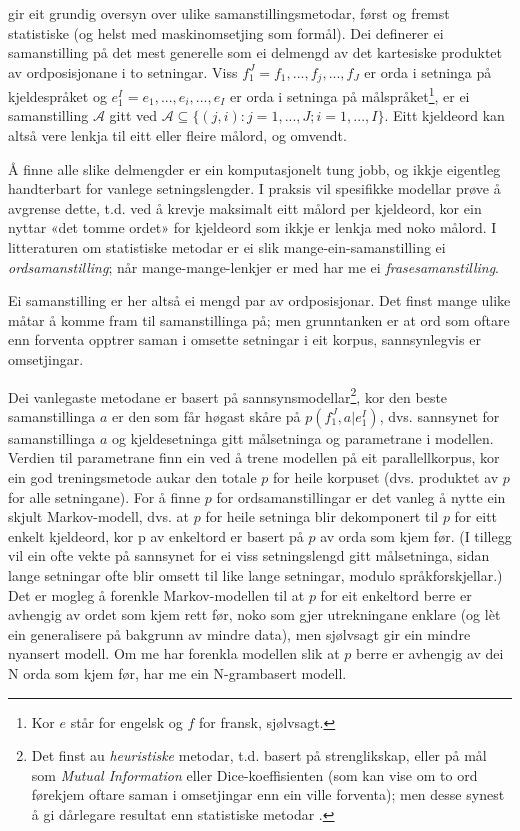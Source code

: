 \documentclass[11pt,a4paper,oneside,draft]{report}
\begin{document}
 \citet[s.~20--21]{och2003scv} gir eit grundig oversyn over ulike
 samanstillingsmetodar, først og fremst statistiske (og helst med
 maskinomsetjing som formål). Dei definerer ei samanstilling på det
 mest generelle som ei delmengd av det kartesiske produktet av
 ordposisjonane i to setningar. Viss $f_{1}^{J}=f_1,...,f_j,...,f_J$
 er orda i setninga på kjeldespråket og
 $e_{1}^{I}=e_1,...,e_i,...,e_I$ er orda i setninga på
 målspråket\footnote{Kor $e$ står for engelsk og $f$ for fransk, sjølvsagt. }, er ei samanstilling $\mathcal{A}$ gitt ved
 $\mathcal{A}\subseteq \{(j,i): j=1,...,J;i=1,...,I\}$. Eitt kjeldeord
 kan altså vere lenkja til eitt eller fleire målord, og omvendt.

 Å finne alle slike delmengder er ein komputasjonelt tung jobb, og
 ikkje eigentleg handterbart for vanlege setningslengder.  I praksis
 vil spesifikke modellar prøve å avgrense dette, t.d. ved å krevje
 maksimalt eitt målord per kjeldeord, kor ein nyttar «det tomme ordet»
 for kjeldeord som ikkje er lenkja med noko målord. I litteraturen om
 statistiske metodar er ei slik mange-ein-samanstilling ei
 \emph{ordsamanstilling}; når mange-mange-lenkjer er med har me ei
 \emph{frasesamanstilling}.

 Ei samanstilling er her altså ei mengd par av ordposisjonar. Det
 finst mange ulike måtar å komme fram til samanstillinga på; men
 grunntanken er at ord som oftare enn forventa opptrer saman i omsette
 setningar i eit korpus, sannsynlegvis er omsetjingar.

 Dei vanlegaste metodane er basert på sannsynsmodellar\footnote{Det finst au \emph{heuristiske} metodar, t.d. basert på
        strenglikskap, eller på mål som \emph{Mutual Information} eller
        Dice-koeffisienten (som kan vise om to ord førekjem oftare
        saman i omsetjingar enn ein ville forventa); men desse synest
        å gi dårlegare resultat enn statistiske metodar
        \citep{och2003scv}. }, kor den
 beste samanstillinga $a$ er den som får høgast skåre på
 $p(f_1^J,a|e_1^I)$, dvs. sannsynet for samanstillinga $a$ og
 kjeldesetninga gitt målsetninga og parametrane i modellen. Verdien
 til parametrane finn ein ved å trene modellen på eit parallellkorpus,
 kor ein god treningsmetode aukar den totale $p$ for heile korpuset
 (dvs. produktet av $p$ for alle setningane).  For å finne $p$ for
 ordsamanstillingar er det vanleg å nytte ein skjult Markov-modell,
 dvs. at $p$ for heile setninga blir dekomponert til $p$ for eitt
 enkelt kjeldeord, kor p av enkeltord er basert på $p$ av orda som
 kjem før. (I tillegg vil ein ofte vekte på sannsynet for ei viss
 setningslengd gitt målsetninga, sidan lange setningar ofte blir
 omsett til like lange setningar, modulo språkforskjellar.) Det er
 mogleg å forenkle Markov-modellen til at $p$ for eit enkeltord berre
 er avhengig av ordet som kjem rett før, noko som gjer utrekningane
 enklare (og lèt ein generalisere på bakgrunn av mindre data), men
 sjølvsagt gir ein mindre nyansert modell. Om me har forenkla modellen
 slik at $p$ berre er avhengig av dei N orda som kjem før, har me ein
 N-grambasert modell.
 
\end{document}
